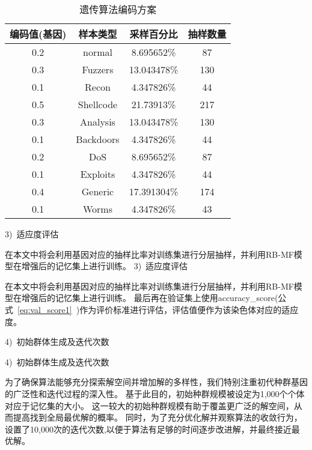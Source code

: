 \begin{table}[h]
\begin{table}[h]
	\caption{遗传算法编码方案}
	\label{tab:Ga_code}
	\centering
	\begin{tabular}{cccc}
		\toprule
		\textbf{编码值(基因)} & \textbf{样本类型} & \textbf{采样百分比} & \textbf{抽样数量} \\
		\midrule
		0.2                   & normal            & 8.695652\%          & 87                \\
		0.3                   & Fuzzers           & 13.043478\%         & 130               \\
		0.1                   & Recon             & 4.347826\%          & 44                \\
		0.5                   & Shellcode         & 21.73913\%          & 217               \\
		0.3                   & Analysis          & 13.043478\%         & 130               \\
		0.1                   & Backdoors         & 4.347826\%          & 44                \\
		0.2                   & DoS               & 8.695652\%          & 87                \\
		0.1                   & Exploits          & 4.347826\%          & 44                \\
		0.4                   & Generic           & 17.391304\%         & 174               \\
		0.1                   & Worms             & 4.347826\%          & 43                \\
		\bottomrule
	\end{tabular}
\end{table}

3)~适应度评估\par
在本文中将会利用基因对应的抽样比率对训练集进行分层抽样，并利用RB-MF模型在增强后的记忆集上进行训练。
3)~适应度评估\par
在本文中将会利用基因对应的抽样比率对训练集进行分层抽样，并利用RB-MF模型在增强后的记忆集上进行训练。
最后再在验证集上使用accuracy\_score(公式~\ref{eq:val_score1}~)作为评价标准进行评估，评估值便作为该染色体对应的适应度。\par

4)~初始群体生成及迭代次数\par
4)~初始群体生成及迭代次数\par
为了确保算法能够充分探索解空间并增加解的多样性，我们特别注重初代种群基因的广泛性和迭代过程的深入性。
基于此目的，初始种群规模被设定为1,000个个体对应于记忆集的大小。
这一较大的初始种群规模有助于覆盖更广泛的解空间，从而提高找到全局最优解的概率。
同时，为了充分优化解并观察算法的收敛行为，设置了10,000次的迭代次数,以便于算法有足够的时间逐步改进解，并最终接近最优解。\par


\end{table}
